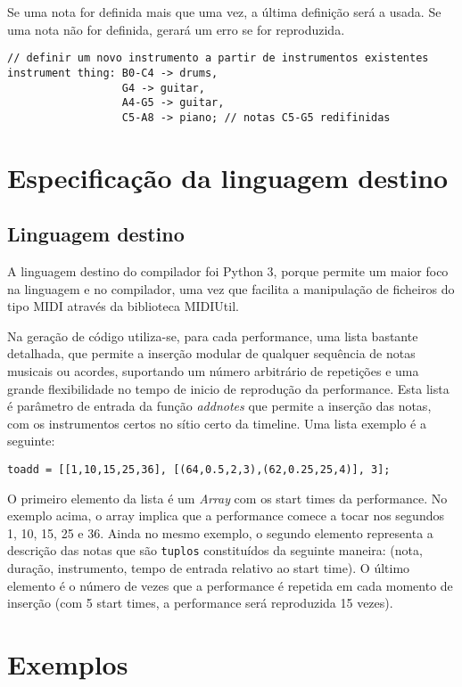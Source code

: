 \documentclass{article}
\begin{document}
Se uma nota for definida mais que uma vez, a última definição será a usada. Se uma nota não for definida, gerará um erro se for reproduzida.
\begin{lstlisting} 
// definir um novo instrumento a partir de instrumentos existentes
instrument thing: B0-C4 -> drums,
                  G4 -> guitar,
                  A4-G5 -> guitar, 
                  C5-A8 -> piano; // notas C5-G5 redifinidas
\end{lstlisting}


\section{Especificação da linguagem destino} \label{target}
\subsection{Linguagem destino}
A linguagem destino do compilador foi Python 3, porque permite um maior foco na linguagem e no compilador, uma vez que facilita a manipulação de ficheiros do tipo MIDI através da biblioteca MIDIUtil.

Na geração de código utiliza-se, para cada performance, uma lista bastante detalhada, que permite a inserção modular de qualquer sequência de notas musicais ou acordes, suportando um número arbitrário de repetições e uma grande flexibilidade no tempo de inicio de reprodução da performance. Esta lista é parâmetro de entrada da função \textit{addnotes} que permite a inserção das notas, com os instrumentos certos no sítio certo da timeline. Uma lista exemplo é a seguinte:

\begin{lstlisting}
toadd = [[1,10,15,25,36], [(64,0.5,2,3),(62,0.25,25,4)], 3];
\end{lstlisting}

O primeiro elemento da lista é um \textit{Array} com os start times da performance. No exemplo acima, o array implica que a performance comece a tocar nos segundos 1, 10, 15, 25 e 36. Ainda no mesmo exemplo, o segundo elemento representa a descrição das notas que são \texttt{tuplos} constituídos da seguinte maneira: (nota, duração, instrumento, tempo de entrada relativo ao start time). O último elemento é o número de vezes que a performance é repetida em cada momento de inserção (com 5 start times, a performance será reproduzida 15 vezes).

\clearpage

\section{Exemplos} \label{example}
\end{document}
